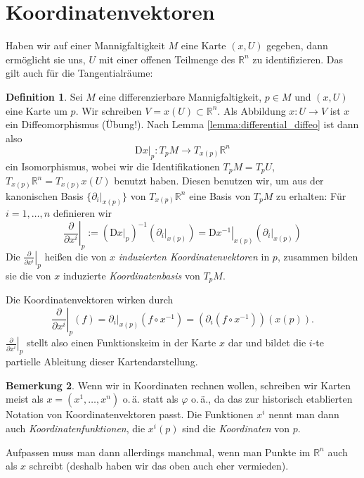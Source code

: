 \documentclass[a4paper]{scrreprt}
\numberwithin{equation}{chapter}
\newcommand{\DD}{\mathrm{D}}
\theoremstyle{definition}
\newtheorem{defn}{Definition}[section]
\newtheorem{bem}[defn]{Bemerkung}
\begin{document}
\section{Koordinatenvektoren}

Haben wir auf einer Mannigfaltigkeit $M$ eine Karte $(x,U)$ gegeben, dann ermöglicht sie uns, $U$ mit einer offenen Teilmenge des $\mathbb R^n$ zu identifizieren. Das gilt auch für die Tangentialräume:
\begin{defn}
	Sei $M$ eine differenzierbare Mannigfaltigkeit, $p\in M$ und $(x,U)$ eine Karte um $p$. Wir schreiben $V = x(U) \subset \mathbb R^n$. Als Abbildung $x\colon U \to V$ ist $x$ ein Diffeomorphismus (Übung!). Nach Lemma \ref{lemma:differential_diffeo} ist dann also
	\[\left.\DD x\right|_p \colon T_pM \to T_{x(p)} \mathbb R^n\]
	ein Isomorphismus, wobei wir die Identifikationen $T_pM = T_pU$, $T_{x(p)}\mathbb R^n = T_{x(p)} x(U)$ benutzt haben. Diesen benutzen wir, um aus der kanonischen Basis $\{\left.\partial_i\right|_{x(p)}\}$ von $T_{x(p)}\mathbb R^n$ eine Basis von $T_pM$ zu erhalten: Für $i = 1,\dots, n$ definieren wir
	\[\left.\frac{\partial}{\partial x^i}\right|_p := \left(\left.\DD x\right|_p\right)^{-1} \left(\left.\partial_i\right|_{x(p)}\right) = \left.\DD x^{-1}\right|_{x(p)} \left(\left.\partial_i\right|_{x(p)}\right)\]
	Die $\left.\frac{\partial}{\partial x^i}\right|_p$ heißen die von $x$ \emph{induzierten Koordinatenvektoren} in $p$, zusammen bilden sie die von $x$ induzierte \emph{Koordinatenbasis} von $T_pM$.
\end{defn}
Die Koordinatenvektoren wirken durch
\[\left.\frac{\partial}{\partial x^i}\right|_p(f) = \left.\partial_i\right|_{x(p)} (f \circ x^{-1}) = \left(\partial_i (f\circ x^{-1})\right) (x(p)).\]
$\left.\frac{\partial}{\partial x^i}\right|_p$ stellt also einen Funktionskeim in der Karte $x$ dar und bildet die $i$-te partielle Ableitung dieser Kartendarstellung.

\begin{bem}
	Wenn wir in Koordinaten rechnen wollen, schreiben wir Karten meist als $x = (x^1, \dots, x^n)$ o.\,ä. statt als $\varphi$ o.\,ä., da das zur historisch etablierten Notation von Koordinatenvektoren passt. Die Funktionen $x^i$ nennt man dann auch \emph{Koordinatenfunktionen}, die $x^i(p)$ sind die \emph{Koordinaten} von $p$.

	Aufpassen muss man dann allerdings manchmal, wenn man Punkte im $\mathbb R^n$ auch als $x$ schreibt (deshalb haben wir das oben auch eher vermieden).
\end{bem}
\end{document}
